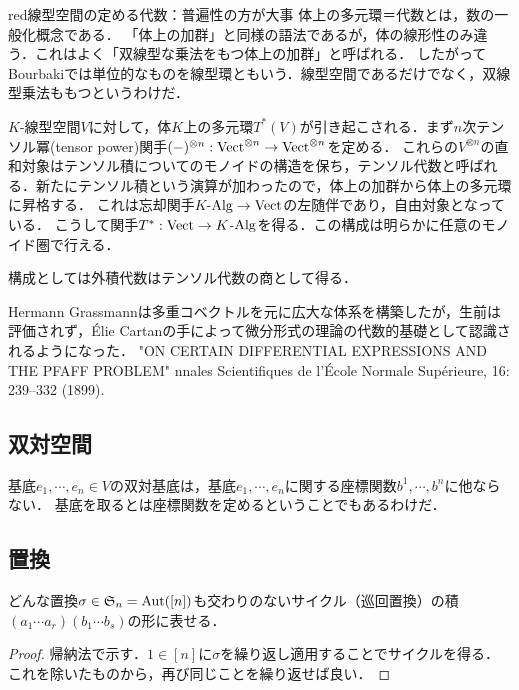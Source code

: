 \documentclass[uplatex,dvipdfmx]{jsreport}
\begin{document}
\begin{tbox}{red}{線型空間の定める代数：普遍性の方が大事}
    体上の多元環＝代数とは，数の一般化概念である．
    「体上の加群」と同様の語法であるが，体の線形性のみ違う．これはよく「双線型な乗法をもつ体上の加群」と呼ばれる．
    したがってBourbakiでは単位的なものを線型環ともいう．線型空間であるだけでなく，双線型乗法ももつというわけだ．

    $K$-線型空間$V$に対して，体$K$上の多元環$T^*(V)$が引き起こされる．まず$n$次テンソル冪(tensor power)関手$(-)^{\otimes n}:\mathrm{Vect}^{\otimes n}\to\mathrm{Vect}^{\otimes n}$を定める．
    これらの$V^{\otimes n}$の直和対象はテンソル積についてのモノイドの構造を保ち，テンソル代数と呼ばれる．新たにテンソル積という演算が加わったので，体上の加群から体上の多元環に昇格する．
    これは忘却関手$K$-$\mathrm{Alg}\to\mathrm{Vect}$の左随伴であり，自由対象となっている．
    こうして関手$T^*:\mathrm{Vect}\to K$-$\mathrm{Alg}$を得る．この構成は明らかに任意のモノイド圏で行える．

    構成としては外積代数はテンソル代数の商として得る．
\end{tbox}

\begin{history}
    Hermann Grassmannは多重コベクトルを元に広大な体系を構築したが，生前は評価されず，Élie Cartanの手によって微分形式の理論の代数的基礎として認識されるようになった．
    "ON CERTAIN DIFFERENTIAL EXPRESSIONS AND THE PFAFF PROBLEM" nnales Scientifiques de l'École Normale Supérieure, 16: 239–332 (1899).
\end{history}

\subsection{双対空間}

\begin{example}\label{example-coordinates-as-dual-mappings}
    基底$e_1,\cdots,e_n\in V$の双対基底は，基底$e_1,\cdots,e_n$に関する座標関数$b^1,\cdots,b^n$に他ならない．
    基底を取るとは座標関数を定めるということでもあるわけだ．
\end{example}

\subsection{置換}

\begin{lemma}
    どんな置換$\sigma\in\mathfrak{S}_n=\mathrm{Aut}([n])$も交わりのないサイクル（巡回置換）の積$(a_1\cdots a_r)(b_1\cdots b_s)$の形に表せる．
\end{lemma}
\begin{proof}
    帰納法で示す．$1\in[n]$に$\sigma$を繰り返し適用することでサイクルを得る．これを除いたものから，再び同じことを繰り返せば良い．
\end{proof}
\end{document}

